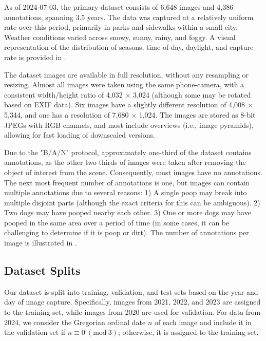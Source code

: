 \documentclass[10pt,twocolumn,letterpaper]{article}
\begin{document}
As of 2024-07-03, the primary dataset consists of 6,648 images and 4,386 annotations, spanning 3.5 years.
The data was captured at a relatively uniform rate over this period, primarily in parks and sidewalks within
  a small city.
Weather conditions varied across snowy, sunny, rainy, and foggy.
A visual representation of the distribution of seasons, time-of-day, daylight, and capture rate is provided
  in .


The dataset images are available in full resolution, without any resampling or resizing.
Almost all images were taken using the same phone-camera, with a consistent width/height ratio of 4,032
  $\times$ 3,024 (although some may be rotated based on EXIF data).
Six images have a slightly different resolution of 4,008 $\times$ 5,344, and one has a resolution of 7,680
  $\times$ 1,024.
The images are stored as 8-bit JPEGs with RGB channels, and most include overviews (i.e., image pyramids),
  allowing for fast loading of downscaled versions.


Due to the "B/A/N" protocol, approximately one-third of the dataset contains annotations, as the other
  two-thirds of images were taken after removing the object of interest from the scene.
Consequently, most images have no annotations.
The next most frequent number of annotations is one, but images can contain multiple annotations due to
  several reasons:
1) A single poop may break into multiple disjoint parts (although the exact criteria for this can be
  ambiguous).
2) Two dogs may have pooped nearby each other.
3) One or more dogs may have pooped in the same area over a period of time (in some cases, it can be
  challenging to determine if it is poop or dirt).
The number of annotations per image is illustrated in .


\subsection{Dataset Splits}

Our dataset is split into training, validation, and test sets based on the year and day of image capture.
Specifically, images from 2021, 2022, and 2023 are assigned to the training set, while images from 2020 are
  used for validation.
For data from 2024, we consider the Gregorian ordinal date $n$ of each image and include it in the validation set if
$n \equiv 0 \ (\textrm{mod}\ 3)$; otherwise, it is assigned to the training set.
\end{document}
